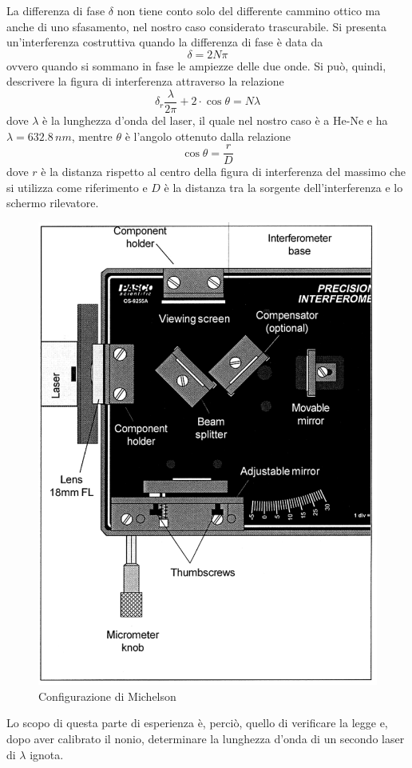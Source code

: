 La differenza di fase $\delta$ non tiene conto solo del differente cammino ottico ma anche di uno sfasamento, nel nostro caso considerato trascurabile. Si presenta un'interferenza costruttiva quando la differenza di fase è data da
$$
\delta=2N\pi 
$$
ovvero quando si sommano in fase le ampiezze delle due onde. Si può, quindi, descrivere la figura di interferenza attraverso la relazione
\begin{equation}
    \delta_r \dfrac{\lambda}{2\pi}+2\cdot\cos\theta=N\lambda
\end{equation}
dove $\lambda$ è la lunghezza d'onda del laser, il quale nel nostro caso è a He-Ne e ha $\lambda=632.8\,nm$, mentre $\theta$ è l'angolo ottenuto dalla relazione 
$$
\cos\theta=\dfrac{r}{D}
$$
dove $r$ è la distanza rispetto al centro della figura di interferenza del massimo che si utilizza come riferimento e $D$ è la distanza tra la sorgente dell'interferenza e lo schermo rilevatore.
\begin{figure}[h!]
    \centering
    \includegraphics[scale=.37]{immagini/michaelson.png}
    \caption{Configurazione di Michelson}
    \label{michelino}
\end{figure}
Lo scopo di questa parte di esperienza è, perciò, quello di verificare la legge e, dopo aver calibrato il nonio, determinare la lunghezza d'onda di un secondo laser di $\lambda$ ignota.
\\

